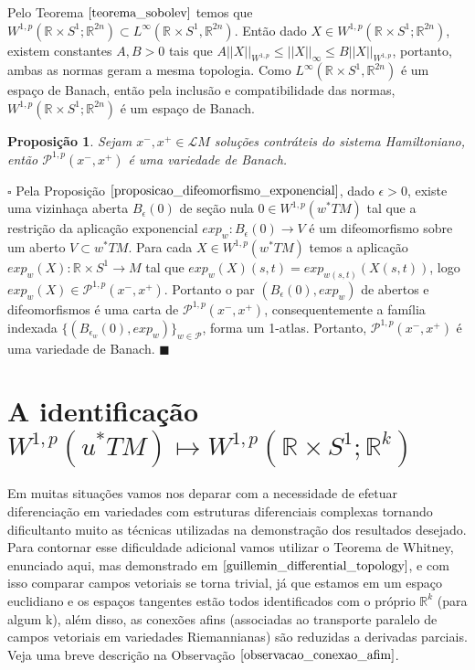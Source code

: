 \documentclass[12pt]{book}
\newtheorem{proposicao}[teorema]{Proposição}
\newenvironment{prova}[1]{$\square$ #1}{\hfill$\blacksquare$}
\newcommand{\aplicacaoexponencial}[2]{exp_{#1}(#2)}
\newcommand{\aplicacaoexponencialgeral}[1]{exp_{#1}}
\newcommand{\caminhosexponenciaisconectantesabrev}{\mathcal{P}}
\newcommand{\caminhosexponenciaisconectantes}[2]{\mathcal{P}^{1,p}(#1, #2)}
\newcommand{\caminhosexponenciaisconectantespadrao}{\caminhosexponenciaisconectantes{x^{-}}{x^{+}}}
\newcommand{\circulo}{S^{1}}
\newcommand{\espacosobolev}[1]{W^{1,p}(#1)}
\newcommand{\espacosobolevcontradominio}[2]{W^{1,p}(#1;#2)}
\newcommand{\norma}[1]{||#1||}
\newcommand{\normaWp}[1]{||#1||_{W^{1,p}}}
\newcommand{\pullbackfibradotangente}[2]{#1^{*}T#2}
\newcommand{\pullbackfibradotangenteM}[1]{\pullbackfibradotangente{#1}{M}}
\newcommand{\retacartesianocirculo}{\real{} \times \circulo}
\newcommand{\real}[1]{\mathbb{R}^{#1}}
\newcommand{\solucoesperiodicascontrateis}{\mathcal{L}M}
\begin{document}
	Pelo Teorema $\ref{teorema_sobolev}$ temos que $\espacosobolevcontradominio{\retacartesianocirculo}{\real{2n}} \subset L^{\infty}(\retacartesianocirculo, \real{2n})$. Então dado $X \in \espacosobolevcontradominio{\retacartesianocirculo}{\real{2n}}$, existem constantes $A, B >0$ tais que $A\normaWp{X}\leq \norma{X}_{\infty} \leq B\normaWp{X}$, portanto, ambas as normas geram a mesma topologia. Como $L^{\infty}(\retacartesianocirculo, \real{2n})$ é um espaço de Banach, então pela inclusão e compatibilidade das normas, $\espacosobolevcontradominio{\retacartesianocirculo}{\real{2n}}$ é um espaço de Banach.
	
	\begin{proposicao}\label{proposicao_variedade_banach}
		Sejam $x^{-}, x^{+} \in \solucoesperiodicascontrateis$ soluções contráteis do sistema Hamiltoniano, então $\caminhosexponenciaisconectantespadrao$ é uma variedade de Banach.
	\end{proposicao}
	\begin{prova}
		Pela Proposição $\ref{proposicao_difeomorfismo_exponencial}$, dado $\epsilon > 0$, existe uma vizinhaça aberta $B_{\epsilon}(0)$ de seção nula $0 \in \espacosobolev{\pullbackfibradotangenteM{w}}$ tal que a restrição da aplicação exponencial $\aplicacaoexponencialgeral{w}:B_{\epsilon}(0) \to V$ é um difeomorfismo sobre um aberto $V \subset \pullbackfibradotangenteM{w}$. Para cada $X \in \espacosobolev{\pullbackfibradotangenteM{w}}$ temos a aplicação $\aplicacaoexponencial{w}{X}:\retacartesianocirculo \to M$ tal que $\aplicacaoexponencial{w}{X}(s,t) = \aplicacaoexponencial{w(s,t)}{X(s,t)}$, logo $\aplicacaoexponencial{w}{X} \in \caminhosexponenciaisconectantespadrao$. Portanto o par $(B_{\epsilon}(0), \aplicacaoexponencialgeral{w})$ de abertos e difeomorfismos é uma carta de $\caminhosexponenciaisconectantespadrao$, consequentemente a família indexada $\{(B_{\epsilon_{w}}(0), \aplicacaoexponencialgeral{w})\}_{w \in \caminhosexponenciaisconectantesabrev}$, forma um 1-atlas. Portanto, $\caminhosexponenciaisconectantespadrao$ é uma variedade de Banach.
	\end{prova}
	
	\section{A identificação  $\espacosobolev{\pullbackfibradotangenteM{u}} \mapsto \espacosobolevcontradominio{\retacartesianocirculo}{\real{k}}$}
	Em muitas situações  vamos nos deparar com a necessidade de efetuar diferenciação em variedades com estruturas diferenciais complexas tornando dificultanto muito as técnicas utilizadas na demonstração dos resultados desejado. Para contornar esse dificuldade adicional vamos utilizar o Teorema de Whitney, enunciado aqui, mas demonstrado em $\cite{guillemin_differential_topology}$, e com isso comparar campos vetoriais se torna trivial, já que estamos em um espaço euclidiano e os espaços tangentes estão todos identificados com o próprio $\real{k}$ (para algum k), além disso, as conexões afins (associadas ao transporte paralelo de campos vetoriais em variedades Riemannianas) são reduzidas a derivadas parciais. Veja uma breve descrição na Observação $\ref{observacao_conexao_afim}$.
	
\end{document}
